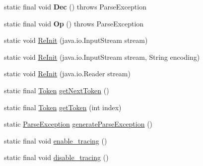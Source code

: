 \begin{DoxyCompactItemize}
\item 
static final void {\bfseries Dec} ()  throws Parse\+Exception \hypertarget{classpack_1_1_my_new_grammar_a1aceac0378171e8a3c68d10df1da1a80}{}\label{classpack_1_1_my_new_grammar_a1aceac0378171e8a3c68d10df1da1a80}

\item 
static final void {\bfseries Op} ()  throws Parse\+Exception \hypertarget{classpack_1_1_my_new_grammar_a59e04a4761f8e8cd5ab22d4eabccae86}{}\label{classpack_1_1_my_new_grammar_a59e04a4761f8e8cd5ab22d4eabccae86}

\item 
static void \hyperlink{classpack_1_1_my_new_grammar_a13bdc59c38fe6d234eef3ff60c68769a}{Re\+Init} (java.\+io.\+Input\+Stream stream)
\item 
static void \hyperlink{classpack_1_1_my_new_grammar_a710ef7a7d5e76f019e4c23bab8f630bd}{Re\+Init} (java.\+io.\+Input\+Stream stream, String encoding)
\item 
static void \hyperlink{classpack_1_1_my_new_grammar_aba33e1c468139a779dd95d5e1ae89bd2}{Re\+Init} (java.\+io.\+Reader stream)
\item 
static final \hyperlink{classpack_1_1_token}{Token} \hyperlink{classpack_1_1_my_new_grammar_aee22832b82978e7b16b5222ba6783477}{get\+Next\+Token} ()
\item 
static final \hyperlink{classpack_1_1_token}{Token} \hyperlink{classpack_1_1_my_new_grammar_a5f979e9ea57d8667542d97fd2ed765af}{get\+Token} (int index)
\item 
static \hyperlink{classpack_1_1_parse_exception}{Parse\+Exception} \hyperlink{classpack_1_1_my_new_grammar_ade5cc534d74f49b4a081f35ed78ba517}{generate\+Parse\+Exception} ()
\item 
static final void \hyperlink{classpack_1_1_my_new_grammar_a6536f4ef69e5aab07a4aeee61bdce39b}{enable\+\_\+tracing} ()
\item 
static final void \hyperlink{classpack_1_1_my_new_grammar_ace61d79dd7122e5a3926fc819c0be9cc}{disable\+\_\+tracing} ()
\end{DoxyCompactItemize}
